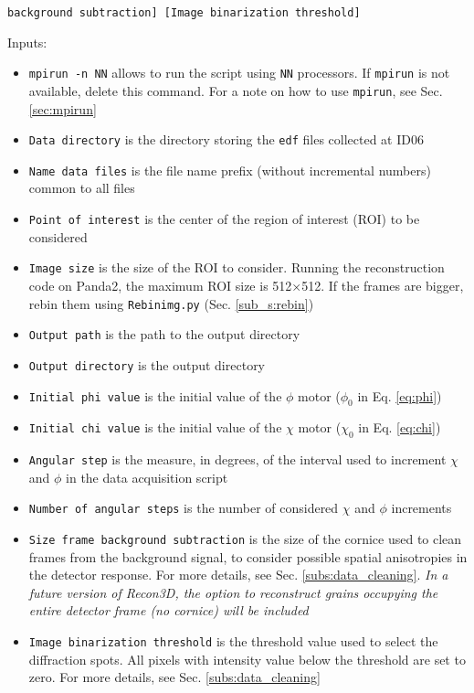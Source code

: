 \documentclass[11pt]{scrartcl}
\begin{document}
{\texttt{background subtraction] [Image binarization threshold]}}

Inputs:

\begin{itemize}
    \item {\texttt{mpirun -n NN}} allows to run the script using {\texttt{NN}} processors. If {\texttt{mpirun}} is not available, delete this command. For a note on how to use {\texttt{mpirun}}, see Sec. \ref{sec:mpirun}
    \item {\texttt{Data directory}} is the directory storing the {\texttt{edf}} files collected at {\footnotesize{ID06}}
    \item {\texttt{Name data files}} is the file name prefix (without incremental numbers) common to all files
    \item {\texttt{Point of interest}} is the center of the region of interest ({\footnotesize{ROI}}) to be considered
    \item {\texttt{Image size}} is the size of the {\footnotesize{ROI}} to consider. Running the reconstruction code on Panda2, the maximum {\footnotesize{ROI}} size is 512$\times$512. If the frames are bigger, rebin them using {\texttt{Rebin\textunderscore img.py}} (Sec. \ref{sub_s:rebin})
    \item {\texttt{Output path}} is the path to the output directory
    \item {\texttt{Output directory}} is the output directory
    \item {\texttt{Initial phi value}} is the initial value of the $\phi$ motor ($\phi_0$ in Eq. \ref{eq:phi})
    \item {\texttt{Initial chi value}} is the initial value of the $\chi$ motor ($\chi_0$ in Eq. \ref{eq:chi})
    \item {\texttt{Angular step}} is the measure, in degrees, of the interval used to increment $\chi$ and $\phi$ in the data acquisition script
    \item {\texttt{Number of angular steps}} is the number of considered $\chi$ and $\phi$ increments
    \item {\texttt{Size frame background subtraction}} is the size of the cornice used to clean frames from the background signal, to consider possible spatial anisotropies in the detector response. For more details, see Sec. {\ref{subs:data_cleaning}}. {\textit{In a future version of Recon3D, the option to reconstruct grains occupying the entire detector frame (no cornice) will be included}}
    \item {\texttt{Image binarization threshold}} is the threshold value used to select the diffraction spots. All pixels with intensity value below the threshold are set to zero. For more details, see Sec. {\ref{subs:data_cleaning}}
\end{itemize}
\end{document}
